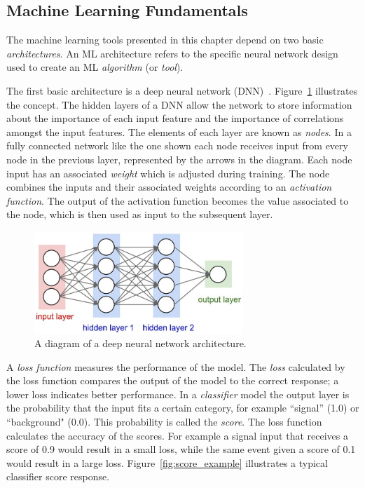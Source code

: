 \subsection{Machine Learning Fundamentals}
\label{sec:ml_fund}

The machine learning tools presented in this chapter depend on two basic \textit{architectures}.
An ML architecture refers to the specific neural network design used to create an ML \textit{algorithm} (or \textit{tool}). 

The first basic architecture is a deep neural network (DNN)~\cite{dnn}.
Figure~\ref{fig:dnn} illustrates the concept.
The hidden layers of a DNN allow the network to store information about the importance of each input feature and the importance of correlations amongst the input features.
The elements of each layer are known as \textit{nodes}.
In a fully connected network like the one shown each node receives input from every node in the previous layer, represented by the arrows in the diagram.
Each node input has an associated \textit{weight} which is adjusted during training.
The node combines the inputs and their associated weights according to an \textit{activation function}.
The output of the activation function becomes the value associated to the node, which is then used as input to the subsequent layer.

\begin{figure}[!htbp]
\centering
   \includegraphics[width=0.7\textwidth]{figures/ml/dnn}
    \caption{A diagram of a deep neural network architecture. 
    \label{fig:dnn}}
\end{figure}

A \textit{loss function} measures the performance of the model. 
The \textit{loss} calculated by the loss function compares the output of the model to the correct response; a lower loss indicates better performance.
In a \textit{classifier} model the output layer is the probability that the input fits a certain category, for example ``signal'' (1.0) or ``background" (0.0).
This probability is called the \textit{score}.
The loss function calculates the accuracy of the scores.
For example a signal input that receives a score of 0.9 would result in a small loss, while the same event given a score of 0.1 would result in a large loss.
Figure~\ref{fig:score_example} illustrates a typical classifier score response.

